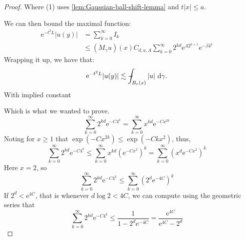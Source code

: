 \documentclass[a4paper,oneside,10pt]{amsproc}
\theoremstyle{remark}
\newcommand{\D}{\,\textup{d}}
\def\Xint#1{\mathchoice
  {\XXint\displaystyle\textstyle{#1}}%
  {\XXint\textstyle\scriptstyle{#1}}%
  {\XXint\scriptstyle\scriptscriptstyle{#1}}%
  {\XXint\scriptscriptstyle\scriptscriptstyle{#1}}%
  \!\int}
\def\XXint#1#2#3{{\setbox0=\hbox{$#1{#2#3}{\int}$ }
    \vcenter{\hbox{$#2#3$ }}\kern-.535\wd0}}
\def\dashint{\Xint-}
\renewcommand{\leq}{\leqslant}
\renewcommand{\leq}{\leqslant}
\renewcommand{\geq}{\geqslant}
\newcommand{\e}{\mathrm{e}} %
\renewcommand{\leq}{\leqslant}%
\renewcommand{\geq}{\geqslant}%
\begin{document}
\begin{proof}
  Where (1) uses \autoref{lem:Gaussian-ball-shift-lemma}
  and $t |x| \leq a$.



  We can then bound the maximal function:
  \begin{align*}
    \e^{-t^2 L} |u(y)| &= \sum_{k = 0}^\infty I_k\\
    &\leq (M_\gamma u)(x) C_{d, a, A} \sum_{k = 0}^\infty 2^{kd} \e^{\Lambda 2^{k + 1}} \e^{-\beta 4^k}
  \end{align*}
  Wrapping it up, we have that:
  \begin{equation*}
    \e^{-t^2 L} |u(y)| \lesssim \dashint_{B_r(x)} |u| \, \D\gamma.
  \end{equation*}
  With implied constant

  Which is what we wanted to prove.
  \begin{equation*}
    \sum_{k = 0}^\infty 2^{kd} \e^{-C 4^k} = \sum_{k = 0}^\infty x^{kd} \e^{-C x^{2k}}
  \end{equation*}
  Noting for $x \geq 1$ that $\exp(-C x^{2k}) \leq \exp(-C k x^2)$,
  thus,
  \begin{equation*}
    \sum_{k = 0}^\infty 2^{kd} \e^{-C 4^k} \leq \sum_{k = 0}^\infty
    x^{kd} (\e^{-C x^2})^k = \sum_{k = 0}^\infty (x^{d} \e^{-C x^2})^k
  \end{equation*}
  Here $x = 2$, so
  \begin{equation*}
    \sum_{k = 0}^\infty 2^{kd} \e^{-C 4^k} \leq \sum_{k = 0}^\infty
    (2^d \e^{-4 C})^k
  \end{equation*}
  If $2^d < \e^{4C}$, that is whenever $d \log 2 < 4C$, we can compute
  using the geometric series that
  \begin{equation*}
    \sum_{k = 0}^\infty 2^{kd} \e^{-C 4^k} \leq \frac1{1 - 2^d
      \e^{-4C}} = \frac{\e^{4C}}{\e^{4C} - 2^d}
  \end{equation*}


\end{proof}

\printbibliography
\end{document}
